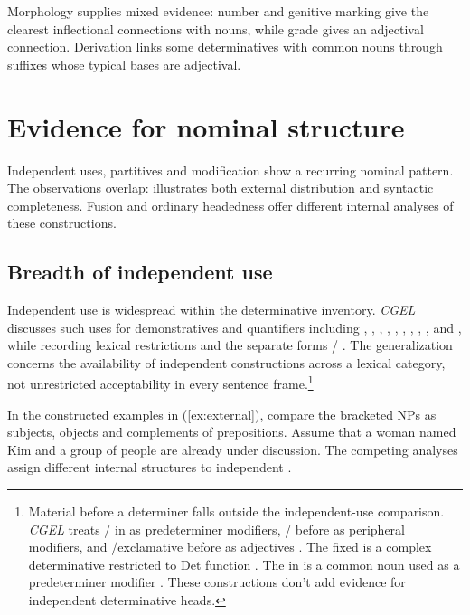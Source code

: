 \documentclass[12pt]{article}
\begin{document}
Morphology supplies mixed evidence: number and genitive marking give the clearest inflectional connections with nouns, while grade gives an adjectival connection. Derivation links some determinatives with common nouns through suffixes whose typical bases are adjectival.

\section{Evidence for nominal structure}\label{sec:evidence}

Independent uses, partitives and modification show a recurring nominal pattern. The observations overlap:  illustrates both external distribution and syntactic completeness. Fusion and ordinary headedness offer different internal analyses of these constructions.

\subsection{Breadth of independent use}\label{sec:independent}

Independent use is widespread within the determinative inventory. \textit{CGEL} discusses such uses for demonstratives and quantifiers including , , , , , , , , ,  and , while recording lexical restrictions and the separate forms / \citep[371--372, 410--424]{huddleston2002}. The generalization concerns the availability of independent constructions across a lexical category, not unrestricted acceptability in every sentence frame.\footnote{Material before a determiner falls outside the independent-use comparison. \textit{CGEL} treats / in  as predeterminer modifiers, / before  as peripheral modifiers, and /exclamative  before  as adjectives \citep[433--437]{huddleston2002}. The fixed  is a complex determinative restricted to Det function \citep[394]{huddleston2002}. The  in  is a common noun used as a predeterminer modifier \citep[434]{huddleston2002}. These constructions don't add evidence for independent determinative heads.}

In the constructed examples in (\ref{ex:external}), compare the bracketed NPs as subjects, objects and complements of prepositions. Assume that a woman named Kim and a group of people are already under discussion. The competing analyses assign different internal structures to independent .
\end{document}
